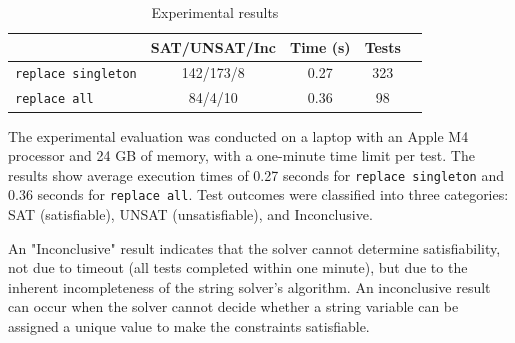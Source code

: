 


\begin{table}[h]
  \centering
  \small
  \begin{tabular}{lcccc}
      \toprule
      & \textbf{SAT/UNSAT/Inc} & \textbf{Time (s)} & \textbf{Tests} \\
      \midrule
      \texttt{replace singleton} & 142/173/8 & 0.27 & 323\\
      \texttt{replace all} & 84/4/10 & 0.36 & 98\\
      \bottomrule
  \end{tabular}
  \caption{Experimental results}
  \label{tab:string_operations}
\end{table}

The experimental evaluation was conducted on a laptop with an Apple M4 processor and 24 GB of memory, with a one-minute time limit per test. The results show average execution times of 0.27 seconds for \texttt{replace singleton} and 0.36 seconds for \texttt{replace all}. Test outcomes were classified into three categories: SAT (satisfiable), UNSAT (unsatisfiable), and Inconclusive.

An "Inconclusive" result indicates that the solver cannot determine satisfiability, not due to timeout (all tests completed within one minute), but due to the inherent incompleteness of the string solver's algorithm. An inconclusive result can occur when the solver cannot decide whether a string variable can be assigned a unique value to make the constraints satisfiable.


